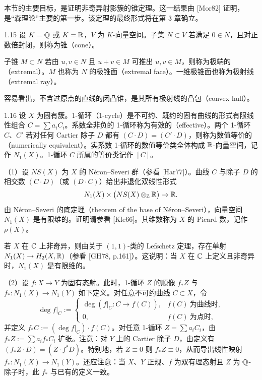 本节的主要目标，是证明非奇异射影簇的锥定理。这一结果由 [Mor82] 证明，是“森理论”主要的第一步。该定理的最终形式将在第 3 章确立。

\begin{definition}{1.15}
设 $K=\mathbb{Q}$ 或 $K=\mathbb{R}$，$V$ 为 $K$-向量空间。子集 $N\subset V$ 若满足 $0\in N$，且对正数倍封闭，则称为锥（cone）。

子锥 $M\subset N$ 若由 $u,v\in N$ 且 $u+v\in M$ 可推出 $u,v\in M$，则称为极端的（extremal）。$M$ 也称为 $N$ 的极锥面（extremal face）。一维极锥面也称为极射线（extremal ray）。

容易看出，不含过原点的直线的闭凸锥，是其所有极射线的凸包（convex hull）。
\end{definition}

\begin{definition}{1.16}
设 $X$ 为固有簇。1-循环（1-cycle）是不可约、既约的固有曲线的形式有限线性组合 $C=\sum a_iC_i$。系数全非负的 1-循环称为有效的（effective）。两个 1-循环 $C$、$C'$ 若对任何 Cartier 除子 $D$ 都有 $(C\cdot D)=(C'\cdot D)$，则称为数值等价的（numerically equivalent）。实系数 1-循环的数值等价类全体构成 $\mathbb{R}$-向量空间，记作 $N_1(X)$。1-循环 $C$ 所属的等价类记作 $[C]$。

（1）设 $NS(X)$ 为 $X$ 的 Néron–Severi 群（参看 [Har77]）。曲线 $C$ 与除子 $D$ 的相交数 $(C\cdot D)$（或 $(D\cdot C)$）给出非退化双线性形式
\[ N_1(X)\times\bigl(NS(X)\otimes_{\mathbb{Z}}\mathbb{R}\bigr)\to\mathbb{R}. \]
由 Néron–Severi 的底定理（theorem of the base of Néron–Severi），向量空间 $N_1(X)$ 是有限维的。证明请参看 [Kle66]。其维数称为 $X$ 的 Picard 数，记作 $\rho(X)$。

若 $X$ 在 $\mathbb{C}$ 上非奇异，则由关于 $(1,1)$-类的 Lefschetz 定理，存在单射 $N_1(X)\to H_2(X,\mathbb{R})$（参看 [GH78, p.161]）。这说明：当 $X$ 在 $\mathbb{C}$ 上定义且非奇异时，$N_1(X)$ 是有限维的。

（2）设 $f:X\to Y$ 为固有态射。此时，1-循环 $Z$ 的顺像 $f_*Z$ 与 $f_*:N_1(X)\to N_1(Y)$ 如下定义。对任意不可约曲线 $C\subset X$，令
\[ \deg f|_C:=\begin{cases}\deg(f|_C:C\to f(C)), & f(C)\ \text{为曲线时},\\ 0, & f(C)\ \text{为点时},\end{cases} \]
并定义 $f_*C:=(\deg f|_C)\cdot f(C)$。对任意 1-循环 $Z=\sum a_iC_i$，由 $f_*Z:=\sum a_if_*C_i$ 扩张。注意：对 $Y$ 上的 Cartier 除子 $D$，由定义有 $(f_*Z\cdot D)=(Z\cdot f^*D)$。特别地，若 $Z\equiv0$ 则 $f_*Z\equiv0$，从而导出线性映射 $f_*:N_1(X)\to N_1(Y)$。还应注意：当 $X$、$Y$ 正规、$f$ 为双有理态射且 $Z$ 为 $\mathbb{Q}$-除子时，此 $f_*$ 与已有的定义一致。
\end{definition}

